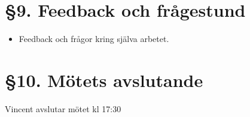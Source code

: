 \documentclass[a4paper, 11pt]{article}
\begin{document}
\section*{§9. Feedback och frågestund}
\begin{itemize}
    \item Feedback och frågor kring själva arbetet.\\
\end{itemize}
    \section*{§10. Mötets avslutande}
Vincent avslutar mötet kl 17:30
\newpage
\thispagestyle{style2}
\makebox{}\\
\makebox{}\\
\makebox{}\\
\makebox[0.4\linewidth]{\rule{0.4\linewidth}{0.4pt}} \hspace{1cm} \makebox[0.4\linewidth]{\rule{0.4\linewidth}{0.4pt}} \hspace{1cm}\\
 \hspace{1cm}
 \hspace{1cm}\\
 \hspace{1cm}
 \hspace{1cm}\\
\makebox{}\\
\makebox{}\\
\makebox{}\\
\end{document}
